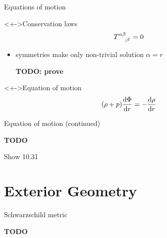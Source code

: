 \documentclass{beamer}
\let\svthefootnote\thefootnote
\newcommand\blankfootnote[1]{%
  \let\thefootnote\relax\footnotetext{#1}%
  \let\thefootnote\svthefootnote%
}
\begin{document}

\begin{frame}{Equations of motion}

\begin{block}<+->{Conservation laws}
\begin{displaymath}
  \tensor{T}{^{\alpha\beta}_{;\beta}} = 0
\end{displaymath}
\end{block}

\begin{itemize}
\item<+-> symmetries make only non-trivial solution $\alpha = r$

\textbf{TODO: prove}
\end{itemize}

\begin{block}<+->{Equation of motion}
\begin{displaymath}
  (\rho + p) \dv{\Phi}{r} = -\dv{\rho}{r}
\end{displaymath}
\end{block}

\blankfootnote{\textcite[pp. 175, 261]{Schutz}}

\end{frame}


\begin{frame}{Equation of motion (continued)}

\textbf{TODO}

Show 10.31

\end{frame}


\section{Exterior Geometry}


\begin{frame}{Schwarzschild metric}

\textbf{TODO}

\end{frame}

\end{document}
